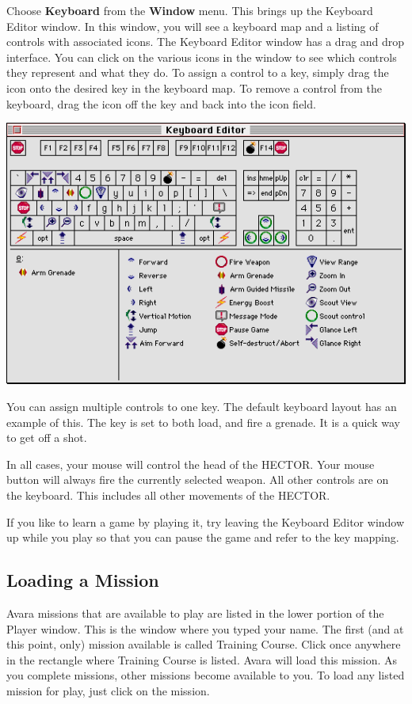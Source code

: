 \documentclass{article}
\begin{document}
Choose \textbf{Keyboard} from the \textbf{Window} menu. This brings up the Keyboard Editor window. In this window, you will see a keyboard map and a listing of controls with associated icons. The Keyboard Editor window has a drag and drop interface. You can click on the various icons in the window to see which controls they represent and what they do. To assign a control to a key, simply drag the icon onto the desired key in the keyboard map. To remove a control from the keyboard, drag the icon off the key and back into the icon field.

\begin{center}
	\includegraphics[width=\textwidth]{img/05.png}
\end{center}

You can assign multiple controls to one key. The default keyboard layout has an example of this. The \textbf{} key is set to both load, and fire a grenade. It is a quick way to get off a shot.

In all cases, your mouse will control the head of the HECTOR. Your mouse button will always fire the currently selected weapon. All other controls are on the keyboard. This includes all other movements of the HECTOR.

If you like to learn a game by playing it, try leaving the Keyboard Editor window up while you play so that you can pause the game and refer to the key mapping.

\subsection{Loading a Mission}
Avara missions that are available to play are listed in the lower portion of the Player window. This is the window where you typed your name. The first (and at this point, only) mission available is called Training Course. Click once anywhere in the rectangle where Training Course is listed. Avara will load this mission. As you complete missions, other missions become available to you. To load any listed mission for play, just click on the mission.
\end{document}
